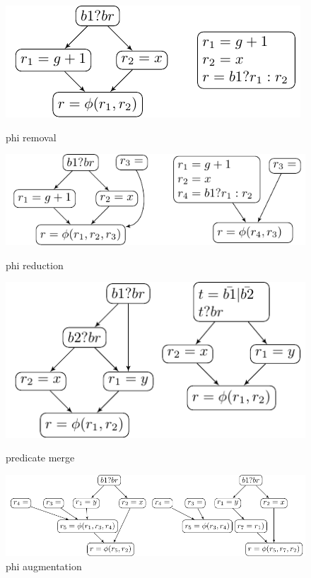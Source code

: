 \begin{figure}
\begin{minipage}[t]{5cm}
\includegraphics[scale=0.4]{phi_removal.pdf}
\caption{phi removal}
\label{fig:phi_rem}
\end{minipage}
\begin{minipage}[t]{5cm}
\includegraphics[scale=0.4]{phi_reduction.pdf}
\caption{phi reduction}
\label{fig:phi_red}
\end{minipage}
\begin{minipage}[t]{5cm}
\includegraphics[scale=0.4]{phi_merge.pdf}
\caption{predicate merge}
\end{minipage}
\begin{minipage}[t]{5cm}
\includegraphics[scale=0.4]{phi_augmentation.pdf}
\caption{phi augmentation}
\label{fig:phi_aug}
\end{minipage}
\label{fig: phi_operations}
\end{figure}

